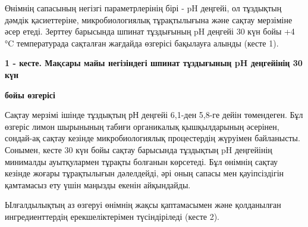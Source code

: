 {Өнімнің сапасының негізгі параметрлерінің бірі - pH деңгейі, ол
тұздықтың дәмдік қасиеттеріне, микробиологиялық тұрақтылығына және
сақтау мерзіміне әсер етеді. Зерттеу барысында шпинат тұздығының pH
деңгейі 30 күн бойы +4 °C температурада сақталған жағдайда өзгерісі
бақылауға алынды (кесте 1).

{\bfseries 1 - кесте. Мақсары майы негізіндегі шпинат тұздығының pH
деңгейінің 30 күн}

{\bfseries бойы өзгерісі}


Сақтау мерзімі ішінде тұздықтың рН деңгейі 6,1-ден 5,8-ге дейін
төмендеген. Бұл өзгеріс лимон шырынының табиғи органикалық қышқылдарының
әсерінен, сондай-ақ сақтау кезінде микробиологиялық процестердің
жүруімен байланысты. Сонымен, кесте 30 күн бойы сақтау барысында
тұздықтың pH деңгейінің минималды ауытқулармен тұрақты болғанын
көрсетеді. Бұл өнімнің сақтау кезінде жоғары тұрақтылығын дәлелдейді,
әрі оның сапасы мен қауіпсіздігін қамтамасыз ету үшін маңызды екенін
айқындайды.

Ылғалдылықтың аз өзгеруі өнімнің жақсы қаптамасымен және қолданылған
ингредиенттердің ерекшеліктерімен түсіндіріледі (кесте 2).

}
